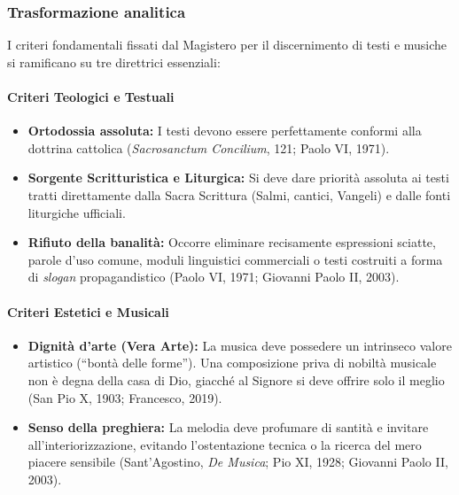 \documentclass[12pt,a4paper]{article}
\begin{document}
	\subsubsection{Trasformazione analitica}\label{trasformazione-analitica-5}
	
	I criteri fondamentali fissati dal Magistero per il discernimento di testi e musiche si ramificano su tre direttrici essenziali:
	
	\paragraph{Criteri Teologici e Testuali}\label{criteri-teologici-e-testuali}
	
	\begin{itemize}[leftmargin=*]
		\item \textbf{Ortodossia assoluta:} I testi devono essere perfettamente conformi alla dottrina cattolica (\emph{Sacrosanctum Concilium}, 121; Paolo VI, 1971).
		\item \textbf{Sorgente Scritturistica e Liturgica:} Si deve dare priorità assoluta ai testi tratti direttamente dalla Sacra Scrittura (Salmi, cantici, Vangeli) e dalle fonti liturgiche ufficiali.
		\item \textbf{Rifiuto della banalità:} Occorre eliminare recisamente espressioni sciatte, parole d'uso comune, moduli linguistici commerciali o testi costruiti a forma di \emph{slogan} propagandistico (Paolo VI, 1971; Giovanni Paolo II, 2003).
	\end{itemize}
	
	\paragraph{Criteri Estetici e Musicali}\label{criteri-estetici-e-musicali}
	
	\begin{itemize}[leftmargin=*]
		\item \textbf{Dignità d'arte (Vera Arte):} La musica deve possedere un intrinseco valore artistico (``bontà delle forme''). Una composizione priva di nobiltà musicale non è degna della casa di Dio, giacché al Signore si deve offrire solo il meglio (San Pio X, 1903; Francesco, 2019).
		\item \textbf{Senso della preghiera:} La melodia deve profumare di santità e invitare all'interiorizzazione, evitando l'ostentazione tecnica o la ricerca del mero piacere sensibile (Sant'Agostino, \emph{De Musica}; Pio XI, 1928; Giovanni Paolo II, 2003).
	\end{itemize}
	
\end{document}

